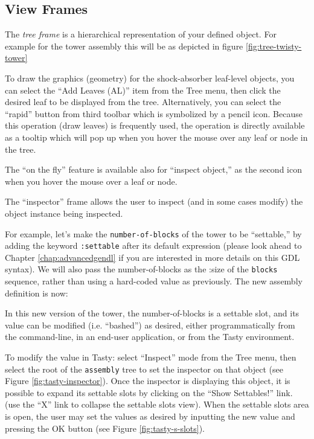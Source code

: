 \documentclass [11pt]{book}
\begin{document}
\subsection{View Frames}

\label{subsec:viewframes}



The \emph{tree frame} is a hierarchical representation of your defined
object. For example for the tower assembly this will be as
depicted in figure 
\ref{fig:tree-twisty-tower}



To draw the graphics (geometry) for the shock-absorber
leaf-level objects, you can select the ``Add Leaves (AL)'' item from
the Tree menu, then click the desired leaf to be displayed from the
tree. Alternatively, you can select the ``rapid'' button from third
toolbar which is symbolized by a pencil icon. Because this
operation (draw leaves) is frequently used, the operation is directly
available as a tooltip which will pop up when you hover the mouse over
any leaf or node in the tree.



The ``on the fly'' feature is available also for ``inspect
object,'' as the second icon when you hover the mouse over a leaf or
node.



The ``inspector'' frame allows the user to inspect (and in
some cases modify) the object instance being inspected.



For example, let's make the \texttt{number-of-blocks} of the tower to be ``settable,'' by adding the keyword \texttt{:settable} after its default expression (please look ahead to Chapter 
\ref{chap:advancedgendl} if you are interested in more details on this  GDL
syntax). We will also pass the number-of-blocks as the :size of the  \texttt{blocks} sequence, rather than using a hard-coded value as
previously. The new assembly definition is now:



In this new version of the tower, the number-of-blocks is a
settable slot, and its value can be modified (i.e. ``bashed'') as
desired, either programmatically from the command-line, in an end-user
application, or from the Tasty environment.



To modify the value in Tasty: select ``Inspect'' mode from the Tree
menu, then select the root of the \texttt{assembly} tree to set the inspector on that object (see Figure 
\ref{fig:tasty-inspector}). Once the inspector is displaying this object, it is
possible to expand its settable slots by clicking on the ``Show
Settables!''  link. (use the ``X'' link to collapse the settable slots
view). When the settable slots area is open, the user may set the
values as desired by inputting the new value and pressing the OK
button (see Figure 
\ref{fig:tasty-s-slots}).
\end{document}
